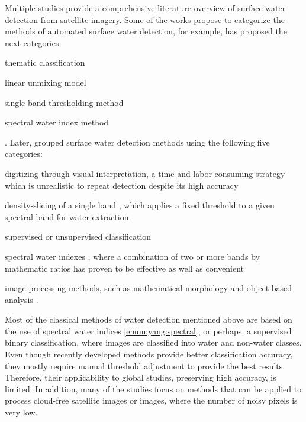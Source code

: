 Multiple studies provide a comprehensive literature overview of surface water detection from satellite imagery. Some of the works propose to categorize the methods of automated surface water detection, for example, \citet{Ji2009} has proposed the next categories:
\begin{enumerate*}[label=(\emph{\alph*})]
	\item \label {enum:ji:thematic} thematic classification \citet{lira2006segmentation}
	\item \label {enum:ji:unmixing} linear unmixing model \citet{sethre2005remote}
	\item \label {enum:ji:th} single-band thresholding method \citet{jain2005delineation}
	\item \label {enum:ji:specral} spectral water index method \citet{McFeeters1996, Xu2006, feyisa2014automated, hoberg2015conditional, fisher2016comparing}
\end{enumerate*}. Later, \citet{yang2015landsat} grouped surface water detection methods using the following five categories: 
\begin{enumerate*}[label=(\emph{\alph*})]
	\item \label {enum:yang:manual} digitizing through visual interpretation, a time and labor-consuming strategy which is unrealistic to repeat detection despite its high accuracy
	\item \label {enum:yang:single} density-slicing of a single band \citet{frazier2000water, ryu2002waterline, white1999monitoring}, which applies a fixed threshold to a given spectral band for water extraction
	\item \label {enum:yang:ml} supervised or unsupervised classification
	\item \label {enum:yang:spectral} spectral water indexes \citet{McFeeters1996, Xu2006, hoberg2015conditional, fisher2016comparing}, where a combination of two or more bands by mathematic ratios has proven to be effective as well as convenient
	\item \label {enum:yang:im} image processing methods, such as mathematical morphology and object-based analysis \citet{blaschke2010object, lira2006segmentation, yang2015landsat}.
\end{enumerate*} 

Most of the classical methods of water detection mentioned above are based on the use of spectral water indices \ref{enum:yang:spectral}, or perhaps, a supervised binary classification, where images are classified into water and non-water classes. Even though recently developed methods provide better classification accuracy, they mostly require manual threshold adjustment to provide the best results. Therefore, their applicability to global studies, preserving high accuracy, is limited. In addition, many of the studies focus on methods that can be applied to process cloud-free satellite images or images, where the number of noisy pixels is very low.

